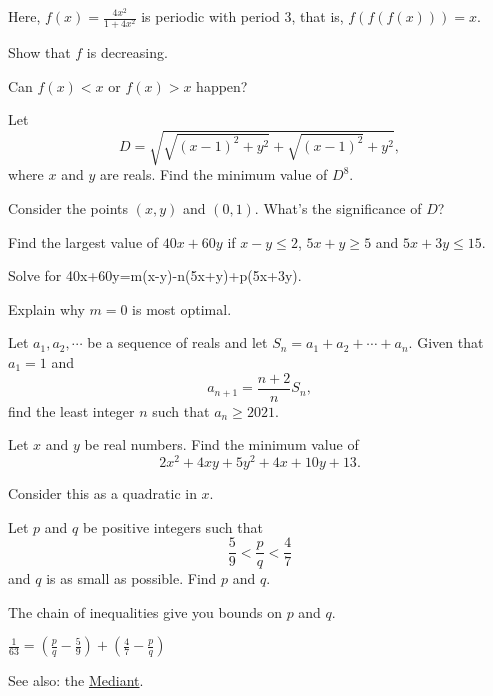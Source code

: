\documentclass[../jarvis.tex]{subfiles}
\begin{document}
\begin{remark}
    Here, $f(x)=\frac{4x^2}{1+4x^2}$ is periodic with period $3$, that is, $f(f(f(x)))=x$.
\end{remark}
\begin{hints}
    \begin{hint}
        Show that $f$ is decreasing.
    \end{hint}
    \begin{hint}
        Can $f(x)<x$ or $f(x)>x$ happen?
    \end{hint}
\end{hints}
\problem[2021 SMO(S) P14]Let $$D=\sqrt{\sqrt{(x-1)^2+y^2}+\sqrt{(x-1)^2}+y^2},$$ where $x$ and $y$ are reals. Find the minimum value of $D^8$.
\begin{hints}
    \begin{hint}
        Consider the points $(x,y)$ and $(0,1)$. What's the significance of $D$?
    \end{hint}
\end{hints}
\problem[2022 SMO(S) P17]Find the largest value of $40x+60y$ if $x-y\leq 2$, $5x+y\geq 5$ and $5x+3y\leq 15$.
\begin{hints}
    \begin{hint}
    Solve for 40x+60y=m(x-y)-n(5x+y)+p(5x+3y).
    \end{hint}
    \begin{hint}
        Explain why $m=0$ is most optimal.
    \end{hint}
\end{hints}
\problem[2021 SMO(O) P16]Let $a_1,a_2,\cdots$ be a sequence of reals and let $S_n=a_1+a_2+\cdots+a_n$. Given that $a_1=1$ and 
$$a_{n+1}=\frac{n+2}{n}S_n,$$ find the least integer $n$ such that $a_n\geq 2021$.

\problem[2022 SMO(J) P24]Let $x$ and $y$ be real numbers. Find the minimum value of 
$$2x^2+4xy+5y^2+4x+10y+13.$$
\begin{hints}
    \begin{hint}
        Consider this as a quadratic in $x$.
    \end{hint}
\end{hints}
\problem[2018 AMC12B P17]Let $p$ and $q$ be positive integers such that 
$$\frac{5}{9} < \frac{p}{q} < \frac{4}{7}$$ and $q$ is as small as possible. Find $p$ and $q$.
\begin{hints}
    \begin{hint}
        The chain of inequalities give you bounds on $p$ and $q$.
    \end{hint}
    \begin{hint}
        $\frac{1}{63}=\left(\frac{p}{q}-\frac{5}{9}\right)+\left(\frac{4}{7}-\frac{p}{q}\right)$
    \end{hint}
\end{hints}
\begin{remark}
    See also: the \href{https://en.wikipedia.org/wiki/Mediant_(mathematics)}{Mediant}.
\end{remark}
\end{document}
